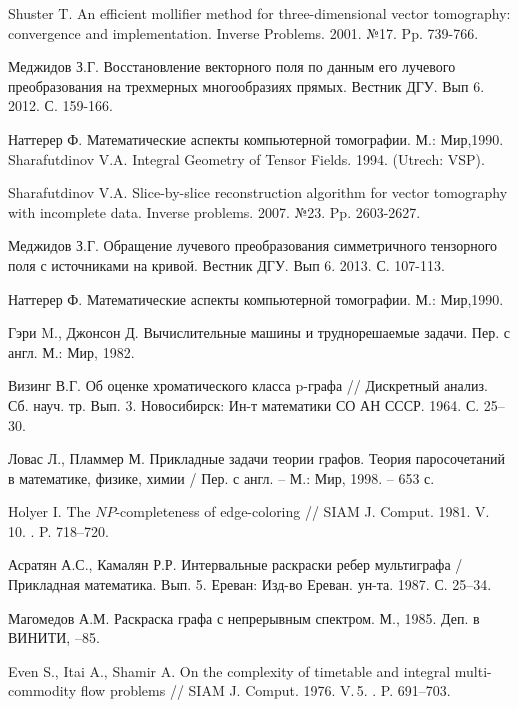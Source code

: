 \begin{thebibliography}{1}
  Shuster T. An efficient mollifier method for three-dimensional vector tomography: convergence and implementation. Inverse Problems. 2001. №17. Pp. 739-766.

  Меджидов З.Г. Восстановление векторного поля по данным его лучевого преобразования на трехмерных многообразиях прямых. Вестник ДГУ. Вып 6. 2012. С. 159-166.

  Наттерер Ф. Математические аспекты компьютерной томографии. М.: Мир,1990.
 Sharafutdinov V.A. Integral Geometry of Tensor Fields. 1994. (Utrech: VSP).

  Sharafutdinov V.A. Slice-by-slice reconstruction algorithm for vector tomography with incomplete data. Inverse problems. 2007. №23. Pp. 2603-2627.

  Меджидов З.Г. Обращение лучевого преобразования симметричного тензорного поля с источниками на кривой. Вестник ДГУ. Вып 6. 2013. С. 107-113.

  Наттерер Ф. Математические аспекты компьютерной томографии. М.: Мир,1990.



{Гэри M., Джонсон Д.} Вычислительные машины и труднорешаемые задачи. Пер. с англ. М.: Мир, 1982.

{Визинг В.Г.} Об оценке хроматического класса p-графа // Дискретный анализ. Сб. науч. тр. Вып. 3. Новосибирск: Ин-т математики СО АН СССР. 1964. С. 25--30.

{Ловас Л., Пламмер М.} Прикладные задачи теории графов. Теория паросочетаний в математике, физике, химии / Пер. с англ. -- М.: Мир, 1998. -- 653 с.

{ Holyer I.} The $NP$-completeness of edge-coloring // SIAM J. Comput. 1981. V. 10. . P. 718--720.

{ Асратян А.С., Камалян Р.Р.} Интервальные раскраски ребер мультиграфа / Прикладная математика. Вып. 5. Ереван: Изд-во Ереван. ун-та. 1987. С. 25--34.

{ Магомедов А.М.} Раскраска графа с непрерывным спектром. М., 1985. Деп. в ВИНИТИ, --85.

{ Even S., Itai A., Shamir A.} On the complexity of timetable and integral multi-commodity flow problems // SIAM J. Comput. 1976. V.\,5. . P. 691--703.


\end{thebibliography}
